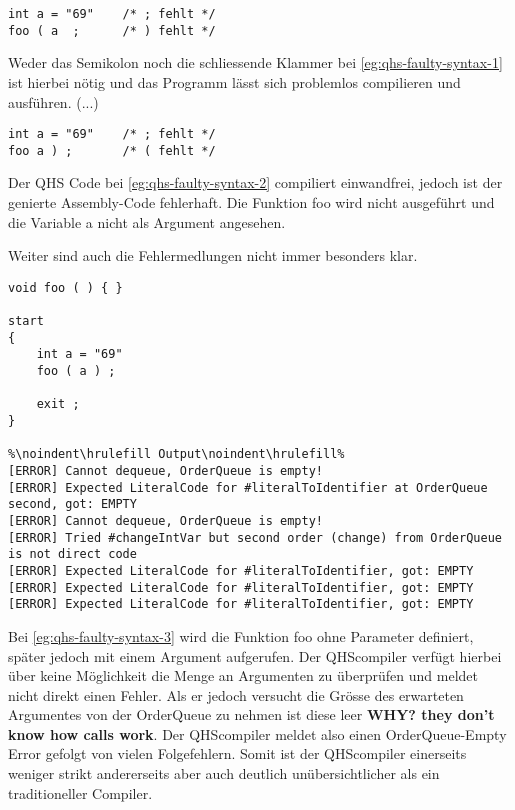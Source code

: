 \begin{lstlisting}[language=QHS, caption=QHS mit fehlerhaftem Syntax, label=eg:qhs-faulty-syntax-1]
int a = "69"    /* ; fehlt */
foo ( a  ;      /* ) fehlt */
\end{lstlisting}

Weder das Semikolon noch die schliessende Klammer bei \ref{eg:qhs-faulty-syntax-1} ist hierbei nötig und das Programm lässt sich problemlos compilieren und ausführen. (...)

\begin{lstlisting}[language=QHS, caption=QHS mit fehlerhaftem Syntax, label=eg:qhs-faulty-syntax-2]
int a = "69"    /* ; fehlt */
foo a ) ;       /* ( fehlt */
\end{lstlisting}

Der QHS Code bei \ref{eg:qhs-faulty-syntax-2} compiliert einwandfrei, jedoch ist der genierte Assembly-Code fehlerhaft. Die Funktion foo wird nicht ausgeführt und die Variable a nicht als Argument angesehen.

Weiter sind auch die Fehlermedlungen nicht immer besonders klar.

\begin{lstlisting}[language=QHS, caption=QHS mit fehlerhaftem Syntax, label=eg:qhs-faulty-syntax-3]
void foo ( ) { }

start
{
    int a = "69" 
    foo ( a ) ;

    exit ;
}

%\noindent\hrulefill Output\noindent\hrulefill%
[ERROR] Cannot dequeue, OrderQueue is empty!
[ERROR] Expected LiteralCode for #literalToIdentifier at OrderQueue second, got: EMPTY
[ERROR] Cannot dequeue, OrderQueue is empty!
[ERROR] Tried #changeIntVar but second order (change) from OrderQueue is not direct code
[ERROR] Expected LiteralCode for #literalToIdentifier, got: EMPTY
[ERROR] Expected LiteralCode for #literalToIdentifier, got: EMPTY
[ERROR] Expected LiteralCode for #literalToIdentifier, got: EMPTY
\end{lstlisting}

Bei \ref{eg:qhs-faulty-syntax-3} wird die Funktion foo ohne Parameter definiert, später jedoch mit einem Argument aufgerufen. Der QHScompiler verfügt hierbei über keine Möglichkeit die Menge an Argumenten zu überprüfen
und meldet nicht direkt einen Fehler. Als er jedoch versucht die Grösse des erwarteten Argumentes von der OrderQueue zu nehmen ist diese leer \textbf{WHY? they don't know how calls work}.
Der QHScompiler meldet also einen OrderQueue-Empty Error gefolgt von vielen Folgefehlern.
Somit ist der QHScompiler einerseits weniger strikt andererseits aber auch deutlich unübersichtlicher als ein traditioneller Compiler.

